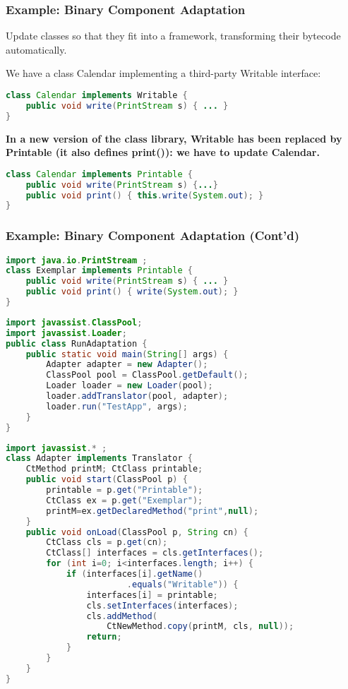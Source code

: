\subsubsection{Example: Binary Component Adaptation}

Update classes so that they fit into a framework, transforming their bytecode automatically.

We have a class Calendar implementing a third-party Writable interface:

\begin{lstlisting}[language=Java]
class Calendar implements Writable {
	public void write(PrintStream s) { ... }
}
\end{lstlisting}

\textbf{In a new version of the class library, Writable has been replaced by Printable (it also defines print()): we have to update Calendar.}

\begin{lstlisting}[language=Java]
class Calendar implements Printable {
	public void write(PrintStream s) {...}
	public void print() { this.write(System.out); }
}
\end{lstlisting}

\subsubsection{Example: Binary Component Adaptation (Cont’d)}

\begin{lstlisting}[language=Java]
import java.io.PrintStream ;
class Exemplar implements Printable {
	public void write(PrintStream s) { ... }
	public void print() { write(System.out); }
}
\end{lstlisting}

\begin{lstlisting}[language=Java]
import javassist.ClassPool;
import javassist.Loader;
public class RunAdaptation {
	public static void main(String[] args) {
		Adapter adapter = new Adapter();
		ClassPool pool = ClassPool.getDefault();
		Loader loader = new Loader(pool);
		loader.addTranslator(pool, adapter);
		loader.run("TestApp", args);
	}
}
\end{lstlisting}

\begin{lstlisting}[language=Java]
import javassist.* ;
class Adapter implements Translator {
	CtMethod printM; CtClass printable;
	public void start(ClassPool p) {
		printable = p.get("Printable");
		CtClass ex = p.get("Exemplar");
		printM=ex.getDeclaredMethod("print",null);
	}
	public void onLoad(ClassPool p, String cn) {
		CtClass cls = p.get(cn);
		CtClass[] interfaces = cls.getInterfaces();
		for (int i=0; i<interfaces.length; i++) {
			if (interfaces[i].getName()
						.equals("Writable")) {
				interfaces[i] = printable;
				cls.setInterfaces(interfaces);
				cls.addMethod(
					CtNewMethod.copy(printM, cls, null));
				return;
			}
		}
	}
}
\end{lstlisting}


